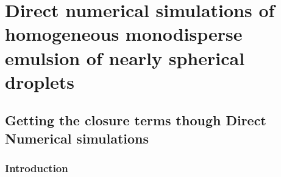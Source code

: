 \documentclass[12pt,a4paper,openany]{My_book}
\begin{document}



\part{Direct numerical simulations of homogeneous monodisperse emulsion of nearly spherical droplets}

\chapter{Getting the closure terms though Direct Numerical simulations}
\label{chap:DNS}
\localtableofcontents

\section{Introduction}

% 

% 
% 
\end{document}
